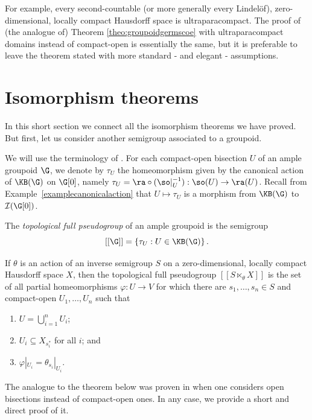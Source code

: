 For example, every second-countable (or more generally every Lindelöf), zero-dimensional, locally compact Hausdorff space is ultraparacompact. The proof of (the analogue of) Theorem \ref{theo:groupoidgermscoe} with ultraparacompact domains instead of compact-open is essentially the same, but it is preferable to leave the theorem stated with more standard - and elegant - assumptions.

\section{Isomorphism theorems}

In this short section we connect all the isomorphism theorems we have proved. But first, let us consider another semigroup associated to a groupoid.

We will use the terminology of \cite{MR2876963}. For each compact-open bisection $U$ of an ample groupoid $\G$, we denote by $\tau_U$ the homeomorphism given by the canonical action of $\KB(\G)$ on $\G[0]$, namely $\tau_U=\ra\circ (\so|_U^{-1}):\so(U)\to\ra(U)$. Recall from Example~\ref{examplecanonicalaction} that $U\mapsto\tau_U$ is a morphism from $\KB(\G)$ to $\mathcal{I}(\G[0])$.

\begin{definition}
The \emph{topological full pseudogroup} of an ample groupoid is the semigroup 
\[[[\G]]=\left\{\tau_U:U\in\KB(\G)\right\}.\]
\end{definition}

\begin{example}
If $\theta$ is an action of an inverse semigroup $S$ on a zero-dimensional, locally compact Hausdorff space $X$, then the topological full pseudogroup $[[S\ltimes_\theta X]]$ is the set of all partial homeomorphisms $\varphi:U\to V$ for which there are $s_1,\ldots,s_n\in S$ and compact-open $U_1,\ldots,U_n$ such that
\begin{enumerate}\setlength\itemsep{1ex}
\item[(i)] $U=\bigcup_{i=1}^n U_i$;
\item[(ii)] $U_i\subseteq X_{s_i^*}$ for all $i$; and
\item[(iii)] $\varphi|_{U_i}=\theta_{s_i}|_{U_i}$.
\end{enumerate}
\end{example}

The analogue to the theorem below was proven in \cite[Corollary~3.3]{MR2460017} when one considers open bisections instead of compact-open ones. In any case, we provide a short and direct proof of it.


